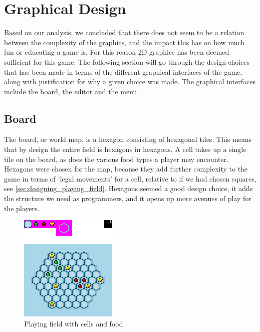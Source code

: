 \section{Graphical Design}
\label{sec:graphical_design}

Based on our analysis, we concluded that there does not seem to be a relation between the complexity of the graphics, and the impact this has on how much fun or educating a game is.
For this reason 2D graphics has been deemed sufficient for this game.
The following section will go through the design choices that has been made in terms of the different graphical interfaces of the game, along with justification for why a given choice was made. The graphical interfaces include the board, the editor and the menu.

\subsection{Board}
The board, or world map, is a hexagon consisting of hexagonal tiles.
This means that by design the entire field is hexagons in hexagons. 
A cell takes up a single tile on the board, as does the various food types a player may encounter.
Hexagons were chosen for the map, because they add further complexity to the game in terms of 'legal movements' for a cell, relative to if we had chosen squares, see \autoref{sec:designing_playing_field}.
Hexagons seemed a good design choice, it adds the structure we need as programmers, and it opens up more avenues of play for the players.\newline

\begin{figure}[h]
	\centering
		\includegraphics{img/cells_mockup.png}
	\caption{Playing field with cells and food}
	\label{fig:cells_mockup}
\end{figure}

